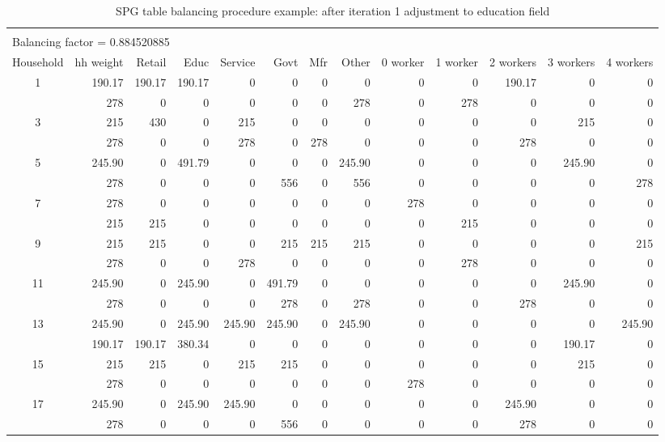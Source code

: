 \begin{sidewaystable}  %
\centering
\caption{SPG table balancing procedure example: after iteration 1 adjustment to education field}
\label{tab:spg-after-education-iteration1}
\small
\begin{tabular}{c*{12}{r}}
\vspace{-8pt} \\
\multicolumn{8}{l}{Balancing factor = 0.884520885} \\
\hline
Household & hh weight & Retail & Educ & Service & Govt & Mfr & Other & 0 worker & 1 worker & 2 workers & 3 workers & 4 workers \\
\hline
1 & 190.17 & 190.17 & 190.17 & 0 & 0 & 0 & 0 & 0 & 0 & 190.17 & 0 & 0 \\
\gray 2 & 278 & 0 & 0 & 0 & 0 & 0 & 278 & 0 & 278 & 0 & 0 & 0 \\
3 & 215 & 430 & 0 & 215 & 0 & 0 & 0 & 0 & 0 & 0 & 215 & 0 \\
\gray 4 & 278 & 0 & 0 & 278 & 0 & 278 & 0 & 0 & 0 & 278 & 0 & 0 \\
5 & 245.90 & 0 & 491.79 & 0 & 0 & 0 & 245.90 & 0 & 0 & 0 & 245.90 & 0 \\
\gray 6 & 278 & 0 & 0 & 0 & 556 & 0 & 556 & 0 & 0 & 0 & 0 & 278 \\
7 & 278 & 0 & 0 & 0 & 0 & 0 & 0 & 278 & 0 & 0 & 0 & 0 \\
\gray 8 & 215 & 215 & 0 & 0 & 0 & 0 & 0 & 0 & 215 & 0 & 0 & 0 \\
9 & 215 & 215 & 0 & 0 & 215 & 215 & 215 & 0 & 0 & 0 & 0 & 215 \\
\gray 10 & 278 & 0 & 0 & 278 & 0 & 0 & 0 & 0 & 278 & 0 & 0 & 0 \\
11 & 245.90 & 0 & 245.90 & 0 & 491.79 & 0 & 0 & 0 & 0 & 0 & 245.90 & 0 \\
\gray 12 & 278 & 0 & 0 & 0 & 278 & 0 & 278 & 0 & 0 & 278 & 0 & 0 \\
13 & 245.90 & 0 & 245.90 & 245.90 & 245.90 & 0 & 245.90 & 0 & 0 & 0 & 0 & 245.90 \\
\gray 14 & 190.17 & 190.17 & 380.34 & 0 & 0 & 0 & 0 & 0 & 0 & 0 & 190.17 & 0 \\
15 & 215 & 215 & 0 & 215 & 215 & 0 & 0 & 0 & 0 & 0 & 215 & 0 \\
\gray 16 & 278 & 0 & 0 & 0 & 0 & 0 & 0 & 278 & 0 & 0 & 0 & 0 \\
17 & 245.90 & 0 & 245.90 & 245.90 & 0 & 0 & 0 & 0 & 0 & 245.90 & 0 & 0 \\
\gray 18 & 278 & 0 & 0 & 0 & 556 & 0 & 0 & 0 & 0 & 278 & 0 & 0 \\

\end{tabular}
\end{sidewaystable}
